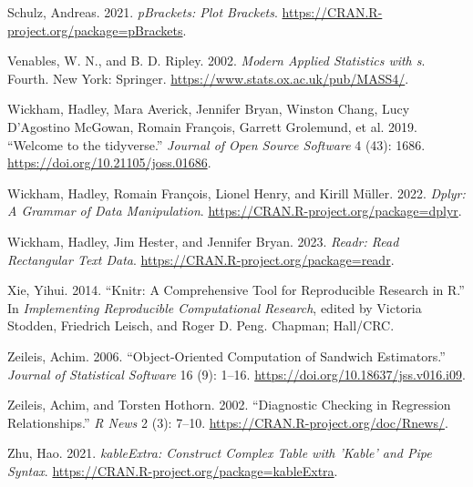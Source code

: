 \documentclass[
]{article}
\newlength{\cslhangindent}
\newlength{\cslentryspacingunit} %
\newenvironment{CSLReferences}[2] %
 {%
  \setlength{\parindent}{0pt}
  \ifodd #1
  \let\oldpar\par
  \def\par{\hangindent=\cslhangindent\oldpar}
  \fi
  \setlength{\parskip}{#2\cslentryspacingunit}
 }%
 {}
\begin{document}
\begin{CSLReferences}{1}{0}
\leavevmode{}%
Schulz, Andreas. 2021. \emph{pBrackets: Plot Brackets}.
\url{https://CRAN.R-project.org/package=pBrackets}.

\leavevmode{}%
Venables, W. N., and B. D. Ripley. 2002. \emph{Modern Applied Statistics
with s}. Fourth. New York: Springer.
\url{https://www.stats.ox.ac.uk/pub/MASS4/}.

\leavevmode{}%
Wickham, Hadley, Mara Averick, Jennifer Bryan, Winston Chang, Lucy
D'Agostino McGowan, Romain François, Garrett Grolemund, et al. 2019.
{``Welcome to the {tidyverse}.''} \emph{Journal of Open Source Software}
4 (43): 1686. \url{https://doi.org/10.21105/joss.01686}.

\leavevmode{}%
Wickham, Hadley, Romain François, Lionel Henry, and Kirill Müller. 2022.
\emph{Dplyr: A Grammar of Data Manipulation}.
\url{https://CRAN.R-project.org/package=dplyr}.

\leavevmode{}%
Wickham, Hadley, Jim Hester, and Jennifer Bryan. 2023. \emph{Readr: Read
Rectangular Text Data}. \url{https://CRAN.R-project.org/package=readr}.

\leavevmode{}%
Xie, Yihui. 2014. {``Knitr: A Comprehensive Tool for Reproducible
Research in {R}.''} In \emph{Implementing Reproducible Computational
Research}, edited by Victoria Stodden, Friedrich Leisch, and Roger D.
Peng. Chapman; Hall/CRC.

\leavevmode{}%
Zeileis, Achim. 2006. {``Object-Oriented Computation of Sandwich
Estimators.''} \emph{Journal of Statistical Software} 16 (9): 1--16.
\url{https://doi.org/10.18637/jss.v016.i09}.

\leavevmode{}%
Zeileis, Achim, and Torsten Hothorn. 2002. {``Diagnostic Checking in
Regression Relationships.''} \emph{R News} 2 (3): 7--10.
\url{https://CRAN.R-project.org/doc/Rnews/}.

\leavevmode{}%
Zhu, Hao. 2021. \emph{kableExtra: Construct Complex Table with 'Kable'
and Pipe Syntax}. \url{https://CRAN.R-project.org/package=kableExtra}.

\end{CSLReferences}
\end{document}
